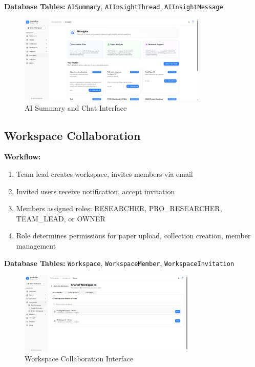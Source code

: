\textbf{Database Tables:} \texttt{AISummary}, \texttt{AIInsightThread}, \texttt{AIInsightMessage}

\begin{figure}[H]
\centering
\includegraphics[width=0.8\textwidth]{images/screenshots/ai_insights.png}
\caption{AI Summary and Chat Interface}
\label{fig:ai}
\end{figure}

\subsection{Workspace Collaboration}

\textbf{Workflow:}
\begin{enumerate}[leftmargin=*,topsep=3pt,itemsep=2pt]
    \item Team lead creates workspace, invites members via email
    \item Invited users receive notification, accept invitation
    \item Members assigned roles: RESEARCHER, PRO\_RESEARCHER, TEAM\_LEAD, or OWNER
    \item Role determines permissions for paper upload, collection creation, member management
\end{enumerate}

\textbf{Database Tables:} \texttt{Workspace}, \texttt{WorkspaceMember}, \texttt{WorkspaceInvitation}

\begin{figure}[H]
\centering
\includegraphics[width=0.75\textwidth]{images/screenshots/shared_workspace.png}
\caption{Workspace Collaboration Interface}
\label{fig:workspace}
\end{figure}

